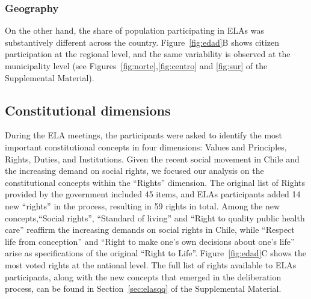 \documentclass[onecolumn]{article}
\begin{document}
\subsubsection*{Geography}

On the other hand, the share of population participating in ELAs was substantively different across the country. 
Figure~\ref{fig:edad}B shows citizen participation at the regional level, and the same variability is observed at the municipality level (see Figures~\ref{fig:norte},\ref{fig:centro} and \ref{fig:sur} of the Supplemental Material). %


\vspace{2mm}

\subsection*{Constitutional dimensions}

During the ELA meetings, the participants were asked to identify the most important constitutional concepts in four dimensions: Values and Principles, Rights, Duties, and Institutions. Given the recent social movement in Chile and the increasing demand on social rights, we focused our analysis on the constitutional concepts within the ``Rights'' dimension. The original list of Rights provided by the government included 45 items, and ELAs participants added 14 new ``rights'' in the process, resulting in 59 rights in total. Among the new concepts,``Social rights'', ``Standard of living'' and ``Right to quality public health care'' reaffirm the increasing demands on social rights in Chile, while ``Respect life from conception'' and  ``Right to make one's own decisions about one's life'' arise as specifications of the original ``Right to Life''.  Figure~\ref{fig:edad}C shows the most voted rights at the national level. The full list of rights available to ELAs participants, along with the new concepts that emerged in the deliberation process, can be found in Section~\ref{sec:elasqq} of the Supplemental Material. 
\end{document}
